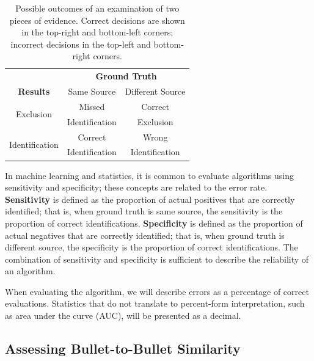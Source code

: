 \documentclass[doubleblind]{elsarticle}\usepackage[]{graphicx}\usepackage[]{color}
\begin{document}
\begin{table}
\centering
\bgroup
\def\arraystretch{.8}%
\begin{tabular}{|ccc}
\multicolumn{1}{c}{} & \multicolumn{2}{c}{\textbf{Ground Truth}}\\\cline{2-3}
\multicolumn{1}{c}{\textbf{Results}} & \multicolumn{1}{|c}{Same Source} & \multicolumn{1}{|c|}{Different Source} \\\hline
\multirow{2}{*}{Exclusion} & \multicolumn{1}{|c}{Missed} & \multicolumn{1}{|c|}{Correct}\\
   &  \multicolumn{1}{|c}{Identification} & \multicolumn{1}{|c|}{Exclusion}\\\hline
\multirow{2}{*}{Identification}  &  \multicolumn{1}{|c}{Correct} & \multicolumn{1}{|c|}{Wrong}\\
   &  \multicolumn{1}{|c}{Identification} & \multicolumn{1}{|c|}{Identification}\\\hline
\end{tabular}
\egroup
\caption{Possible outcomes of an examination of two pieces of evidence. Correct decisions are shown in the top-right and bottom-left corners; incorrect decisions in the top-left and bottom-right corners.\label{tab:possible-outcomes}}
\end{table}


In machine learning and statistics, it is common to evaluate algorithms using sensitivity and specificity; these concepts are related to the error rate. \textbf{Sensitivity} is defined as the proportion of actual positives that are correctly identified; that is, when ground truth is same source, the sensitivity is the proportion of correct identifications. \textbf{Specificity} is defined as the proportion of actual negatives that are correctly identified; that is, when ground truth is different source, the specificity is the proportion of correct identifications. The combination of sensitivity and specificity is sufficient to describe the reliability of an algorithm. 

When evaluating the \citet{aoas2} algorithm, we will describe errors as a percentage of correct evaluations. Statistics that do not translate to percent-form interpretation, such as area under the curve (AUC), will be presented as a decimal. 

\subsection{Assessing Bullet-to-Bullet Similarity}
\end{document}
